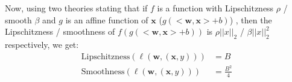 Now, using two theories stating that if $f$ is a function with Lipschitzness $\rho$ / smooth $\beta$ and  $g$ is an affine function of $\pmb{x}$ ($g(<\pmb{w}, \pmb{x}> + b)$) , then the Lipschitzness / smoothness of $f(g(<\pmb{w}, \pmb{x}> + b))$ is $\rho ||x||_2$ / $\beta ||x||^2_2$ respectively, we get:
\begin{equation*}
    \begin{split}        
        \text{Lipschitzness}(\ell(\pmb{w},(\pmb{x}, y))) &= B \\
        \text{Smoothness}(\ell(\pmb{w},(\pmb{x}, y))) &= \frac{B^2}{4} \\
    \end{split}
\end{equation*}
